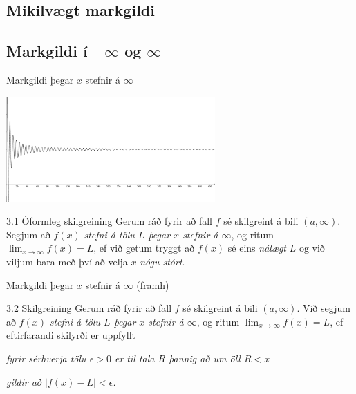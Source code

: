 \documentclass[icelandic,a4paper,12pt]{article}
\begin{document}
\begin{frame}
	\maketitle
\end{frame}

\subsection*{Mikilvægt markgildi}



\subsection*{Markgildi í $-\infty$ og $\infty$}
\begin{frame}{Markgildi þegar $x$ stefnir á $\infty$}
\begin{center}
 \includegraphics[width=8cm,keepaspectratio=true]{./myndir/kafli01/03_liminf.png}
\end{center}
\pause
 \begin{block}{3.1 Óformleg skilgreining}
 Gerum ráð fyrir að fall $f$ sé
skilgreint á bili $(a, \infty)$.  Segjum að  $f(x)$
{\it stefni á tölu $L$ þegar $x$ stefnir á $\infty$}, og ritum
$\lim_{x\rightarrow \infty} f(x)=L$, ef við getum tryggt að  $f(x)$ sé eins
{\em nálægt}
$L$ og við viljum bara með því að velja $x$ {\em nógu stórt}.
 \end{block}
\end{frame}

\begin{frame}{Markgildi þegar $x$ stefnir á $\infty$ (framh)}
\begin{block}{3.2 Skilgreining}
 Gerum ráð fyrir að fall $f$ sé
skilgreint á bili $(a,\infty)$.  Við segjum að $f(x)$
{\it stefni á tölu $L$ þegar $x$ stefnir á $\infty$}, og ritum
$\lim_{x\rightarrow \infty} f(x)=L$, ef eftirfarandi skilyrði er uppfyllt

{\it fyrir sérhverja tölu $\epsilon>0$ er til tala $R$ þannig
  að um öll $R<x$ } 

{\em gildir að  $|f(x)-L|<\epsilon$.}
\end{block}
\end{frame}
\end{document}
